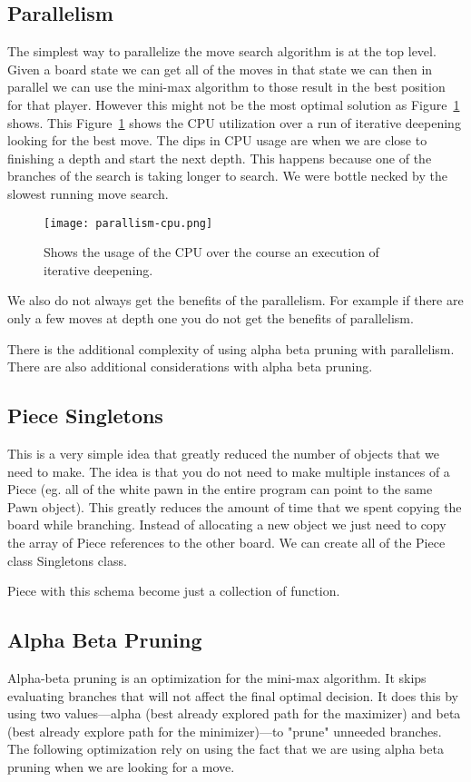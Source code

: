 \documentclass[sigconf]{acmart}
\begin{document}
\subsection{Parallelism}
The simplest way to parallelize the move search algorithm is at the top level.
Given a board state we can get all of the moves in that state we can then in parallel we can use the mini-max algorithm to those result in the best position for that player.
However this might not be the most optimal solution as Figure~\ref{fig:cpu-trace} shows.
This Figure~\ref{fig:cpu-trace} shows the CPU utilization over a run of iterative deepening looking for the best move.
The dips in CPU usage are when we are close to finishing a depth and start the next depth.
This happens because one of the branches of the search is taking longer to search. 
We were bottle necked by the slowest running move search.
\begin{figure}[H]
    \centering
    \texttt{[image: parallism-cpu.png]}
    \caption{Shows the usage of the CPU over the course an execution of iterative deepening.}
    \label{fig:cpu-trace}
\end{figure}
We also do not always get the benefits of the parallelism.
For example if there are only a few moves at depth one you do not get the benefits of parallelism.

There is the additional complexity of using alpha beta pruning with parallelism.
There are also additional considerations with alpha beta pruning.

\subsection{Piece Singletons}
This is a very simple idea that greatly reduced the number of objects that we need to make.
The idea is that you do not need to make multiple instances of a Piece (eg. all of the white pawn in the entire program can point to the same Pawn object).
This greatly reduces the amount of time that we spent copying the board while branching.
Instead of allocating a new object we just need to copy the array of Piece references to the other board.
We can create all of the Piece class Singletons class.

Piece with this schema become just a collection of function.

 \subsection{Alpha Beta Pruning}
 Alpha-beta pruning is an optimization for the mini-max algorithm.
 It skips evaluating branches that will not affect the final optimal decision.
 It does this by using two values—alpha (best already explored path for the maximizer) and beta (best already explore path for the minimizer)—to "prune" unneeded branches.
 The following optimization rely on using the fact that we are using alpha beta pruning when we are looking for a move.
\end{document}
